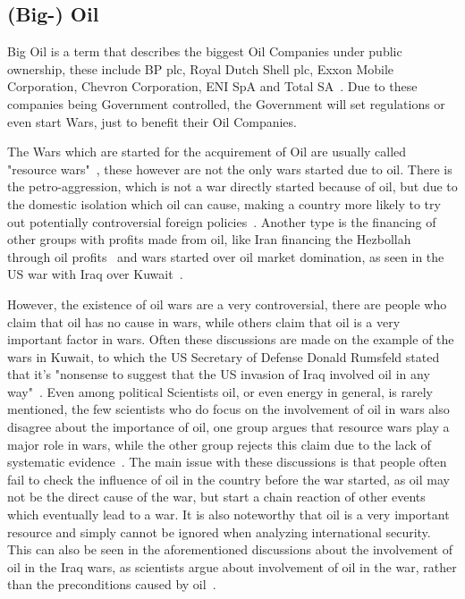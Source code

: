 \subsection{(Big-) Oil}
Big Oil is a term that describes the biggest Oil Companies under public ownership, these  include BP plc, Royal Dutch Shell plc, Exxon Mobile Corporation, Chevron Corporation, ENI SpA and Total SA~\autocite{financial-dictionary-big-oil}. Due to these companies being Government controlled, the Government will set regulations or even start Wars, just to benefit their Oil Companies.

The Wars which are started for the acquirement of Oil are usually called "resource wars"~\autocite{belfercenter-oil-conflict}, these however are not the only wars started due to oil. There is the petro-aggression, which is not a war directly started because of oil, but due to the domestic isolation which oil can cause, making a country more likely to try out potentially controversial foreign policies~\autocite{belfercenter-oil-conflict}. Another type is the financing of other groups with profits made from oil, like Iran financing the Hezbollah through oil profits~\autocite{ny-times-lebanon-hezbollah-fuel} and wars started over oil market domination, as seen in the US war with Iraq over Kuwait~\autocite{britannica-persian-gulf-war}.

However, the existence of oil wars are a very controversial, there are people who claim that oil has no cause in wars, while others claim that oil is a very important factor in wars. Often these discussions are made on the example of the wars in Kuwait, to which the US Secretary of Defense Donald Rumsfeld stated that it's "nonsense to suggest that the US invasion of Iraq involved oil in any way"~\autocite{stokes_blood_for_oil}. Even among political Scientists oil, or even energy in general, is rarely mentioned, the few scientists who do focus on the involvement of oil in wars also disagree about the importance of oil, one group argues that resource wars play a major role in wars, while the other group rejects this claim due to the lack of systematic evidence~\autocite{fueling-fire-jeff-d}. The main issue with these discussions is that people often fail to check the influence of oil in the country before the war started, as oil may not be the direct cause of the war, but start a chain reaction of other events which eventually lead to a war. It is also noteworthy that oil is a very important resource and simply cannot be ignored when analyzing international security. This can also be seen in the aforementioned discussions about the involvement of oil in the Iraq wars, as scientists argue about involvement of oil in the war, rather than the preconditions caused by oil~\autocite{fueling-fire-jeff-d}.

